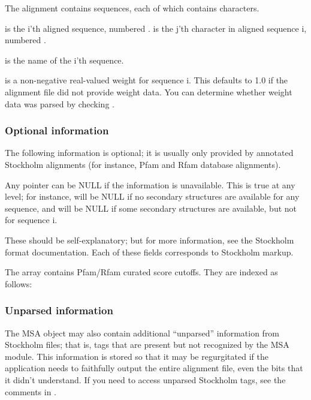 

The alignment contains  sequences, each of which contains
 characters.

 is the i'th aligned sequence, numbered
.  is the j'th character in aligned
sequence i, numbered .

 is the name of the i'th sequence.

 is a non-negative real-valued weight for sequence
i. This defaults to 1.0 if the alignment file did not provide weight
data. You can determine whether weight data was parsed by checking
.

\subsubsection{Optional information}

The following information is optional; it is usually only provided by
annotated Stockholm alignments (for instance, Pfam and Rfam database
alignments). 

Any pointer can be NULL if the information is unavailable. This is
true at any level; for instance,  will be NULL if no
secondary structures are available for any sequence, and 
will be NULL if some secondary structures are available, but not for
sequence i. 



These should be self-explanatory; but for more information, see the
Stockholm format documentation. Each of these fields corresponds to
Stockholm markup.

The  array contains Pfam/Rfam curated score
cutoffs. They are indexed as follows:



\subsubsection{Unparsed information}

The MSA object may also contain additional ``unparsed'' information
from Stockholm files; that is, tags that are present but not
recognized by the MSA module. This information is stored so that it
may be regurgitated if the application needs to faithfully output the
entire alignment file, even the bits that it didn't understand. If you
need to access unparsed Stockholm tags, see the comments in
.

